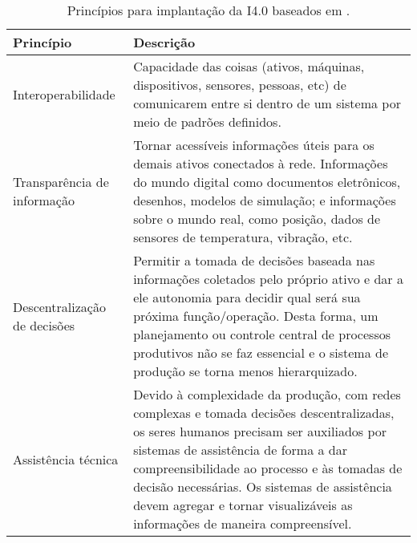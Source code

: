 \begin{table}[htb]
	\centering
	\footnotesize
	\caption{Princípios para implantação da I4.0 baseados em .}
	\label{tab:principios-i4}
	\begin{tabular}{p{3cm}p{12cm}}
		\hline
		\textbf{Princípio}           & \textbf{Descrição}                                                                                                                                                                                                                                                                                                           \\

		\hline
		Interoperabilidade           &
		Capacidade das coisas (ativos, máquinas, dispositivos, sensores, pessoas, etc) de comunicarem entre si dentro de um sistema por meio de padrões definidos.                                                                                                                                                                                                  \\

		\hline
		Transparência de informação  &
		Tornar acessíveis informações úteis para os demais ativos conectados à rede. Informações do mundo digital como documentos eletrônicos, desenhos, modelos de simulação; e informações sobre o mundo real, como posição, dados de sensores de temperatura, vibração, etc.                                                                                     \\

		\hline
		Descentralização de decisões &
		Permitir a tomada de decisões baseada nas informações coletados pelo próprio ativo e dar a ele autonomia para decidir qual será sua próxima função/operação. Desta forma, um planejamento ou controle central de processos produtivos não se faz essencial e o sistema de produção se torna menos hierarquizado.                                            \\

		\hline
		Assistência técnica          &
		Devido à complexidade da produção, com redes complexas e tomada decisões descentralizadas, os seres humanos precisam ser auxiliados por sistemas de assistência de forma a dar compreensibilidade ao processo e às tomadas de decisão necessárias. Os sistemas de assistência devem agregar e tornar visualizáveis as informações de maneira compreensível. \\

		\hline
	\end{tabular}
\end{table}

